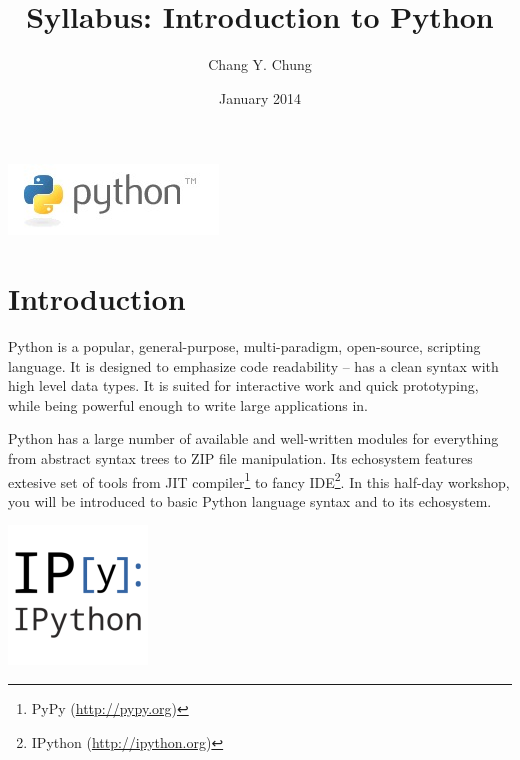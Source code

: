 \documentclass{tufte-handout}
\title{Syllabus: Introduction to Python}
\author{Chang Y. Chung}
\date{January 2014}
\begin{document}
\maketitle

\begin{marginfigure}%
  \includegraphics[width=\linewidth]{python}
  \caption{Python logo from \url{http://www.python.org}. The name is not
    after those dangerous reptiles; it is from the seventies comedy series
    ''Monte Python's Flying Circus''.}
  \label{fig:Python}
\end{marginfigure} 

\section{Introduction}\label{sec:introduction}
Python is a popular, general-purpose, multi-paradigm,
open-source, scripting language. It is designed to emphasize code
readability -- has a clean syntax with high level data types. It is
suited for interactive work and quick prototyping, while being powerful
enough to write large applications in.

Python has a large number of available and well-written modules for
everything from abstract syntax trees to ZIP file manipulation. Its
echosystem features extesive set of tools from JIT compiler\footnote{
PyPy (\url{http://pypy.org})} to fancy IDE\footnote{IPython
(\url{http://ipython.org})}. In this half-day workshop, you will be
introduced to basic Python language syntax and to its echosystem.

\begin{marginfigure}%
  \includegraphics[width=0.4\linewidth]{ipython}
  \caption{IPython (\url{http://ipython.org}) is a rich architecture for
    interactive computing. Version 1.0.0 was released on Aug, 2013.}
  \label{fig:IPython}
\end{marginfigure} 
\end{document}
